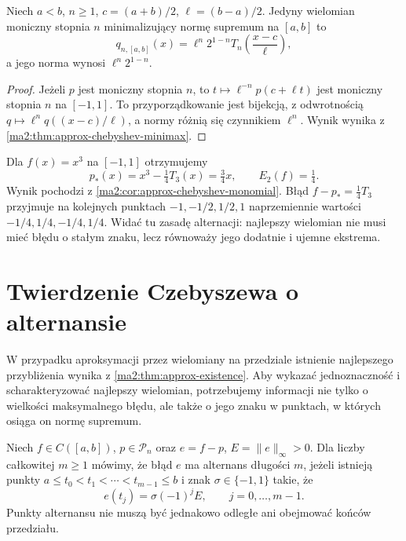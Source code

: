 \begin{wniosek}
\label{ma2:cor:approx-chebyshev-interval}
Niech $a<b$, $n\ge1$, $c=(a+b)/2$,
$\ell=(b-a)/2$.
Jedyny wielomian moniczny stopnia $n$
minimalizujący normę supremum na $[a,b]$ to
\[
 q_{n,[a,b]}(x)=
 \ell^n2^{1-n}T_n\left(\frac{x-c}{\ell}\right),
\]
a jego norma wynosi $\ell^n2^{1-n}$.
\end{wniosek}
\begin{proof}
Jeżeli $p$ jest moniczny stopnia $n$, to
$t\mapsto \ell^{-n}p(c+\ell t)$ jest moniczny
stopnia $n$ na $[-1,1]$.
To przyporządkowanie jest bijekcją, z odwrotnością
$q\mapsto \ell^n q((x-c)/\ell)$, a normy
różnią się czynnikiem $\ell^n$.
Wynik wynika z
\ref{ma2:thm:approx-chebyshev-minimax}.
\end{proof}

\begin{przyklad}
\label{ma2:ex:approx-chebyshev-cubic}
Dla $f(x)=x^3$ na $[-1,1]$ otrzymujemy
\[
 p_*(x)=x^3-\tfrac14 T_3(x)=\tfrac34 x,
 \qquad E_2(f)=\tfrac14.
\]
Wynik pochodzi z
\ref{ma2:cor:approx-chebyshev-monomial}.
Błąd $f-p_*=\tfrac14 T_3$ przyjmuje na
kolejnych punktach $-1,-1/2,1/2,1$
naprzemiennie wartości $-1/4,1/4,-1/4,1/4$.
Widać tu zasadę alternacji: najlepszy
wielomian nie musi mieć błędu o stałym znaku,
lecz równoważy jego dodatnie i ujemne ekstrema.
\end{przyklad}

\section{Twierdzenie Czebyszewa o alternansie}

W przypadku aproksymacji przez wielomiany na przedziale
istnienie najlepszego przybliżenia wynika z
\ref{ma2:thm:approx-existence}. Aby wykazać
jednoznaczność i scharakteryzować najlepszy wielomian,
potrzebujemy informacji nie tylko o wielkości
maksymalnego błędu, ale także o jego znaku
w punktach, w których osiąga on normę supremum.

\begin{definicja}
\label{ma2:def:approx-alternance}
Niech $f\in C([a,b])$, $p\in\mathcal P_n$ oraz
$e=f-p$, $E=\|e\|_\infty>0$.
Dla liczby całkowitej $m\ge1$ mówimy, że błąd $e$
ma alternans długości $m$,
jeżeli istnieją punkty
$a\le t_0<t_1<\cdots<t_{m-1}\le b$
i znak $\sigma\in\{-1,1\}$ takie, że
\[
 e(t_j)=\sigma(-1)^jE,\qquad j=0,\ldots,m-1.
\]
Punkty alternansu nie muszą być jednakowo odległe
ani obejmować końców przedziału.
\end{definicja}

